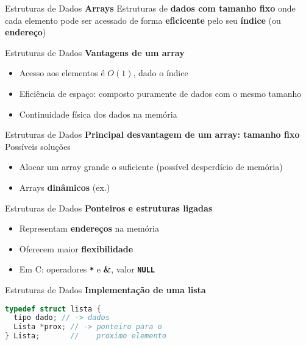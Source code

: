 \documentclass[10pt]{beamer}
\begin{document}
\begin{frame}{Estruturas de Dados}
  \huge
  \textbf{Arrays}
  \vfill
  \LARGE
  Estruturas de \textbf{dados com tamanho fixo} onde cada elemento pode ser acessado de forma \textbf{eficicente} pelo seu \textbf{índice} (ou \textbf{endereço})

\end{frame}

\begin{frame}{Estruturas de Dados}
  \huge
  \textbf{Vantagens de um array}
  \vfill
  \Large
  \begin{itemize}
    \item Acesso aos elementos é $O(1)$, dado o índice
    \item Eficiência de espaço: composto puramente de dados com o mesmo tamanho
    \item Continuidade física dos dados na memória
  \end{itemize}

\end{frame}

\begin{frame}{Estruturas de Dados}
  \huge
  \textbf{Principal desvantagem de um array: tamanho fixo}
  \vfill
  \Large
  Possíveis soluções
  \begin{itemize}
    \item Alocar um array grande o suficiente (possível desperdício de memória)
    \item Arrays \textbf{dinâmicos} (ex.)
  \end{itemize}

\end{frame}

\begin{frame}{Estruturas de Dados}
  \huge
  \textbf{Ponteiros e estruturas ligadas}
  \vfill
  \Large
  \begin{itemize}
    \item Representam \textbf{endereços} na memória
    \item Oferecem maior \textbf{flexibilidade}
    \item Em C: operadores \textbf{\texttt{*}} e \textbf{\&}, valor \textbf{\texttt{NULL}}
  \end{itemize}

\end{frame}

\begin{frame}[fragile]{Estruturas de Dados}
  \huge
  \textbf{Implementação de uma lista}
  \vfill
  \large
  \begin{lstlisting}[language=C]
typedef struct lista {
  tipo dado; // -> dados
  Lista *prox; // -> ponteiro para o
} Lista;       //    proximo elemento
  \end{lstlisting}
\end{frame}
\end{document}

